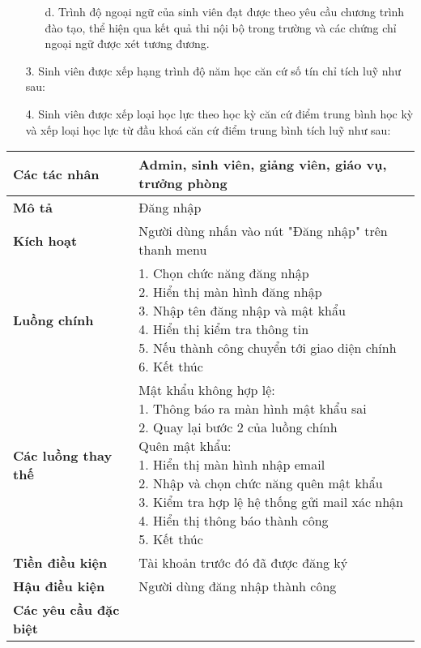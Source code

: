 \begin{itemize}
\begin{itemize}
        \item[d.] Trình độ ngoại ngữ của sinh viên đạt được theo yêu cầu chương trình đào tạo, thể hiện qua kết quả thi nội bộ trong trường và các chứng chỉ ngoại ngữ được xét tương đương.  
      \end{itemize}
    \item[3.] Sinh viên được xếp hạng trình độ năm học căn cứ số tín chỉ tích luỹ như sau:
    \item[4.] Sinh viên được xếp loại học lực theo học kỳ căn cứ điểm trung bình học kỳ và xếp loại học lực từ đầu khoá căn cứ điểm trung bình tích luỹ như sau:
  \end{itemize}
  \begin{tabular}{|l|l|}
    \hline
    \textbf{Các tác nhân}         & Admin, sinh viên, giảng viên, giáo vụ, trưởng phòng \\
    \hline
    \textbf{Mô tả}                & Đăng nhập                                           \\
    \hline
    \textbf{Kích hoạt}            & Người dùng nhấn vào nút "Đăng nhập" trên thanh menu \\
    \hline
    \textbf{Luồng chính}          & \makecell[l]{1. Chọn chức năng đăng nhập            \\ 2. Hiển thị màn hình đăng nhập \\ 3. Nhập tên đăng nhập và mật khẩu \\ 4. Hiển thị kiểm tra thông tin \\ 5. Nếu thành công chuyển tới giao diện chính \\ 6. Kết thúc} \\
    \hline
    \textbf{Các luồng thay thế}   & \makecell[l]{Mật khẩu không hợp lệ:                 \\ 1. Thông báo ra màn hình mật khẩu sai \\ 2. Quay lại bước 2 của luồng chính \\ Quên mật khẩu: \\ 1. Hiển thị màn hình nhập email \\ 2. Nhập và chọn chức năng quên mật khẩu \\ 3. Kiểm tra hợp lệ hệ thống gửi mail xác nhận \\ 4. Hiển thị thông báo thành công \\ 5. Kết thúc} \\
    \hline
    \textbf{Tiền điều kiện}       & Tài khoản trước đó đã được đăng ký                  \\
    \hline
    \textbf{Hậu điều kiện}        & Người dùng đăng nhập thành công                     \\
    \hline
    \textbf{Các yêu cầu đặc biệt} &                                                     \\
    \hline
  \end{tabular}
  

